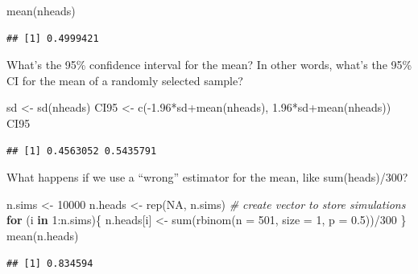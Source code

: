 \documentclass[
]{book}
\newenvironment{Shaded}{\begin{snugshade}}{\end{snugshade}}
\newcommand{\AttributeTok}[1]{\textcolor[rgb]{0.77,0.63,0.00}{#1}}
\newcommand{\CommentTok}[1]{\textcolor[rgb]{0.56,0.35,0.01}{\textit{#1}}}
\newcommand{\ConstantTok}[1]{\textcolor[rgb]{0.00,0.00,0.00}{#1}}
\newcommand{\ControlFlowTok}[1]{\textcolor[rgb]{0.13,0.29,0.53}{\textbf{#1}}}
\newcommand{\DecValTok}[1]{\textcolor[rgb]{0.00,0.00,0.81}{#1}}
\newcommand{\FloatTok}[1]{\textcolor[rgb]{0.00,0.00,0.81}{#1}}
\newcommand{\FunctionTok}[1]{\textcolor[rgb]{0.00,0.00,0.00}{#1}}
\newcommand{\NormalTok}[1]{#1}
\newcommand{\OtherTok}[1]{\textcolor[rgb]{0.56,0.35,0.01}{#1}}
\newcommand{\SpecialCharTok}[1]{\textcolor[rgb]{0.00,0.00,0.00}{#1}}
\begin{document}
\begin{Shaded}
\begin{Highlighting}[]
\FunctionTok{mean}\NormalTok{(nheads)}
\end{Highlighting}
\end{Shaded}

\begin{verbatim}
## [1] 0.4999421
\end{verbatim}

What's the 95\% confidence interval for the mean? In other words, what's the 95\% CI for the mean of a randomly selected sample?

\begin{Shaded}
\begin{Highlighting}[]
\NormalTok{sd }\OtherTok{\textless{}{-}} \FunctionTok{sd}\NormalTok{(nheads)}
\NormalTok{CI95 }\OtherTok{\textless{}{-}} \FunctionTok{c}\NormalTok{(}\SpecialCharTok{{-}}\FloatTok{1.96}\SpecialCharTok{*}\NormalTok{sd}\SpecialCharTok{+}\FunctionTok{mean}\NormalTok{(nheads), }\FloatTok{1.96}\SpecialCharTok{*}\NormalTok{sd}\SpecialCharTok{+}\FunctionTok{mean}\NormalTok{(nheads))}
\NormalTok{CI95}
\end{Highlighting}
\end{Shaded}

\begin{verbatim}
## [1] 0.4563052 0.5435791
\end{verbatim}

What happens if we use a ``wrong'' estimator for the mean, like sum(heads)/300?

\begin{Shaded}
\begin{Highlighting}[]
\NormalTok{n.sims }\OtherTok{\textless{}{-}} \DecValTok{10000}
\NormalTok{n.heads }\OtherTok{\textless{}{-}} \FunctionTok{rep}\NormalTok{(}\ConstantTok{NA}\NormalTok{, n.sims) }\CommentTok{\# create vector to store simulations}
\ControlFlowTok{for}\NormalTok{ (i }\ControlFlowTok{in} \DecValTok{1}\SpecialCharTok{:}\NormalTok{n.sims)\{}
\NormalTok{  n.heads[i] }\OtherTok{\textless{}{-}} \FunctionTok{sum}\NormalTok{(}\FunctionTok{rbinom}\NormalTok{(}\AttributeTok{n =} \DecValTok{501}\NormalTok{, }\AttributeTok{size =} \DecValTok{1}\NormalTok{, }\AttributeTok{p =} \FloatTok{0.5}\NormalTok{))}\SpecialCharTok{/}\DecValTok{300}
\NormalTok{\}}
\FunctionTok{mean}\NormalTok{(n.heads)}
\end{Highlighting}
\end{Shaded}

\begin{verbatim}
## [1] 0.834594
\end{verbatim}
\end{document}
